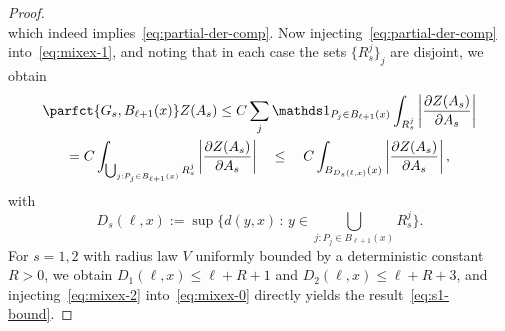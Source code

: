 \begin{proof}
\[\]
which indeed implies~\eqref{eq:partial-der-comp}. Now injecting~\eqref{eq:partial-der-comp} into~\eqref{eq:mixex-1}, and noting that in each case the sets $\{R_s^j\}_j$ are disjoint, we obtain
\begin{multline}\label{eq:mixex-2}
\parfct{G_s,B_{\ell+1}(x)}Z(A_s)\le C\sum_j\mathds1_{P_j\in B_{\ell+1}(x)}\int_{R_s^j}\left|\frac{\partial Z(A_s)}{\partial A_s}\right|\\
=C\int_{\bigcup_{j:P_j\in B_{\ell+1}(x)}R_s^j}\left|\frac{\partial Z(A_s)}{\partial A_s}\right|\quad
\le\quad C\int_{B_{D_s(\ell,x)}(x)}\left|\frac{\partial Z(A_s)}{\partial A_s}\right|,
\end{multline}
with
\[
D_s(\ell,x):=\sup\Big\{d(y,x)\,:\,y\in \bigcup_{j:P_j\in B_{\ell+1}(x)}R_s^j\Big\}.
\]
For $s=1,2$ with radius law $V$ uniformly bounded by a deterministic constant $R>0$, we obtain $D_1(\ell,x)\le\ell+R+1$ and $D_2(\ell,x)\le\ell+R+3$, and injecting~\eqref{eq:mixex-2} into~\eqref{eq:mixex-0} directly yields the result~\eqref{eq:s1-bound}.


\end{proof}
